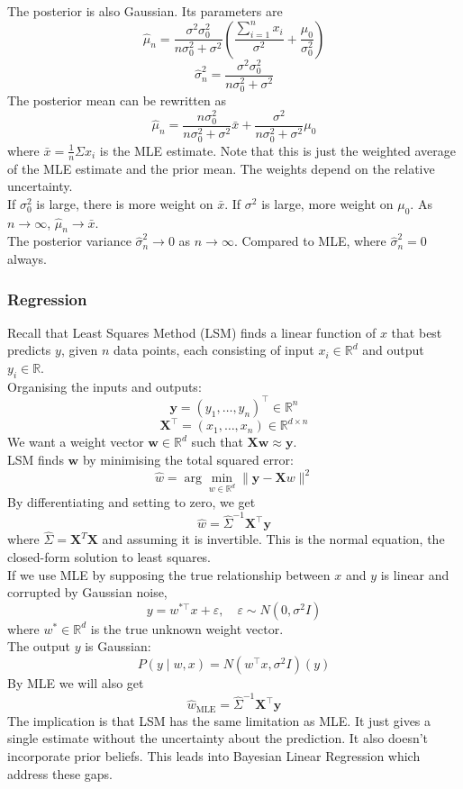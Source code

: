 \documentclass[../Probability.tex]{subfiles}
\begin{document}
The posterior is also Gaussian. Its parameters are
$$\boxed{\hat{\mu}_n = \frac{\sigma^2 \sigma_0^2}{n\sigma_0^2 + \sigma^2}\left(\frac{\sum_{i=1}^n x_i}{\sigma^2} + \frac{\mu_0}{\sigma_0^2}\right)}$$
$$\boxed{\hat{\sigma}_n^2 = \frac{\sigma^2 \sigma_0^2}{n\sigma_0^2 + \sigma^2}}$$
The posterior mean can be rewritten as
$$\hat{\mu}_n = \frac{n\sigma_0^2}{n\sigma_0^2 + \sigma^2}\bar{x} + \frac{\sigma^2}{n\sigma_0^2 + \sigma^2}\mu_0$$
where $\bar{x} = \frac{1}{n}\Sigma x_i$ is the MLE estimate.
Note that this is just the weighted average of the MLE estimate and the prior mean. The weights depend on the relative uncertainty.\\
If $\sigma_0^2$ is large, there is more weight on $\bar{x}$. If $\sigma^2$ is large, more weight on $\mu_0$. As $n\to\infty$, $\hat{\mu}_n \to \bar{x}$.\\
The posterior variance $\hat{\sigma}^2_n \to 0$ as $n \to \infty$. Compared to MLE, where $\hat{\sigma}^2_n = 0$ always. 

\subsubsection{Regression}
Recall that Least Squares Method (LSM) finds a linear function of $x$ that best predicts $y$, given $n$ data points, each consisting of input $x_i \in \mathbb{R}^d$ and output $y_i \in \mathbb{R}$.\\
Organising the inputs and outputs:
$$\mathbf{y} = (y_1, \ldots, y_n)^\top \in \mathbb{R}^n$$
$$\mathbf{X}^\top = (x_1, \ldots, x_n) \in \mathbb{R}^{d \times n}$$
We want a weight vector $\mathbf{w} \in \mathbb{R}^d$ such that $\mathbf{Xw} \approx \mathbf{y}$.\\
LSM finds $\mathbf{w}$ by minimising the total squared error:
$$\hat{w} = \arg\min_{w \in \mathbb{R}^d} \|\mathbf{y} - \mathbf{X}w\|^2$$
By differentiating and setting to zero, we get
$$\boxed{\hat{w} = \hat{\Sigma}^{-1}\mathbf{X}^\top\mathbf{y}}$$
where $\hat{\Sigma} = \mathbf{X}^T\mathbf{X}$ and assuming it is invertible. This is the normal equation, the closed-form solution to least squares.\\
If we use MLE by supposing the true relationship between $x$ and $y$ is linear and corrupted by Gaussian noise,
$$y = w^{*\top}x + \varepsilon, \quad \varepsilon \sim N(0, \sigma^2 I)$$
where $w^* \in \mathbb{R}^d$ is the true unknown weight vector.\\
The output $y$ is Gaussian:
$$P(y \mid w, x) = N(w^\top x, \sigma^2 I)(y)$$
By MLE we will also get
$$\hat{w}_{\text{MLE}} = \hat{\Sigma}^{-1}\mathbf{X}^\top\mathbf{y}$$
The implication is that LSM has the same limitation as MLE. It just gives a single estimate without the uncertainty about the prediction. It also doesn't incorporate prior beliefs.
This leads into Bayesian Linear Regression which address these gaps.
\end{document}
